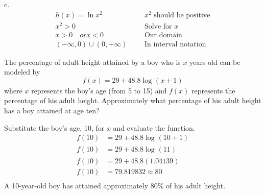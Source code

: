 c.\begin{align*}
		h(x) = \ln{x^2}&     &	    &\text{$x^2$ should be positive} \\
		x^2 > 0&    	&           &\text{Solve for $x$}\\
		x>0\quad or x<0&        &   &\text{Our domain} \\
		(-\infty,0) \cup (0,+\infty)&   &   &\text{In interval notation}
\end{align*}
\begin{exa}
The percentage of adult height attained by a boy who is $x$ years old can be modeled by 
							\[
							f(x) = 29 + 48.8\log_{}(x + 1)
							\]
where $x$ represents the boy’s age (from 5 to 15) and $f(x)$ represents the percentage of 
his adult height. Approximately what percentage of his adult height has a boy attained at 
age ten? 
\end{exa}
Substitute the boy’s age, 10, for $x$ and evaluate the function.
\begin{align*}
	f(10) &= 29 + 48.8\log_{}(10 + 1) \\
	f(10) &= 29 + 48.8\log_{}(11) \\
	f(10) &= 29 + 48.8(1.04139) \\
	f(10) &= 79.819832 \approx 80 \\
\end{align*}
A 10-year-old boy has attained approximately 80\% of his adult height.